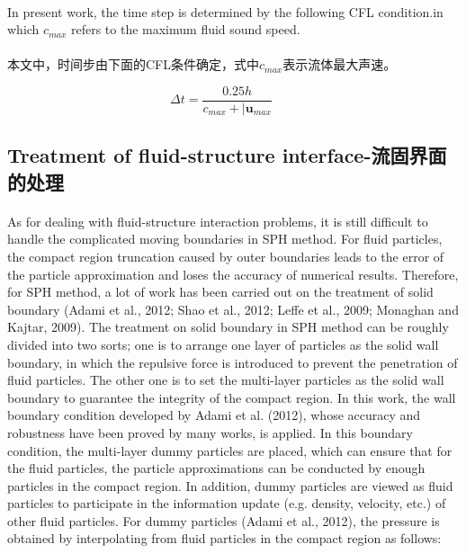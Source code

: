 \documentclass[UTF8]{ctexart}
\begin{document}
\paragraph{\quad}In present work, the time step is determined by the following
                CFL condition.in which $c_{max}$ refers to the maximum fluid sound speed. 
\paragraph{\quad}本文中，时间步由下面的CFL条件确定，式中$c_{max}$表示流体最大声速。

\begin{equation}
   \Delta t = \frac{0.25h}{c_{max}+|\mathbf{u}_{max}} \qquad
\end{equation}


\subsection{Treatment of fluid-structure interface-流固界面的处理}
\paragraph{\quad}As for dealing with fluid-structure interaction problems, it is still 
                difficult to handle the complicated moving boundaries in SPH method. 
                For fluid particles, the compact region truncation caused by outer 
                boundaries leads to the error of the particle approximation and loses 
                the accuracy of numerical results. Therefore, for SPH method, a lot of 
                work has been carried out on the treatment of solid boundary 
                (Adami et al., 2012; Shao et al., 2012; Leffe et al., 2009; Monaghan and Kajtar, 2009). 
                The treatment on solid boundary in SPH method can be roughly divided into two sorts; 
                one is to arrange one layer of particles as the solid wall boundary, in which the 
                repulsive force is introduced to prevent the penetration of fluid particles. The other 
                one is to set the multi-layer particles as the solid wall boundary to guarantee the 
                integrity of the compact region. In this work, the wall boundary condition developed 
                by Adami et al. (2012), whose accuracy and robustness have been proved by many works, 
                is applied. In this boundary condition, the multi-layer dummy particles are placed, which 
                can ensure that for the fluid particles, the particle approximations can be conducted by 
                enough particles in the compact region. In addition, dummy particles are viewed as fluid 
                particles to participate in the information update (e.g. density, velocity, etc.) of other 
                fluid particles. For dummy particles (Adami et al., 2012), the pressure is obtained by 
                interpolating from fluid particles in the compact region as follows:
\end{document}
